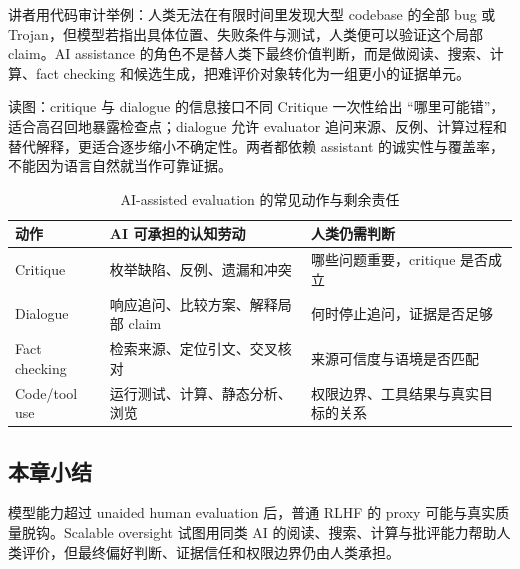 讲者用代码审计举例：人类无法在有限时间里发现大型 codebase 的全部 bug 或 Trojan，但模型若指出具体位置、失败条件与测试，人类便可以验证这个局部 claim。AI assistance 的角色不是替人类下最终价值判断，而是做阅读、搜索、计算、fact checking 和候选生成，把难评价对象转化为一组更小的证据单元。


\begin{knowledgebox}{读图：critique 与 dialogue 的信息接口不同}
Critique 一次性给出 ``哪里可能错''，适合高召回地暴露检查点；dialogue 允许 evaluator 追问来源、反例、计算过程和替代解释，更适合逐步缩小不确定性。两者都依赖 assistant 的诚实性与覆盖率，不能因为语言自然就当作可靠证据。
\end{knowledgebox}

\begin{table}[H]
\centering
\caption{AI-assisted evaluation 的常见动作与剩余责任}
\begin{tabularx}{\textwidth}{L{2.6cm} X X}
\toprule
动作 & AI 可承担的认知劳动 & 人类仍需判断 \\
\midrule
Critique & 枚举缺陷、反例、遗漏和冲突 & 哪些问题重要，critique 是否成立 \\
Dialogue & 响应追问、比较方案、解释局部 claim & 何时停止追问，证据是否足够 \\
Fact checking & 检索来源、定位引文、交叉核对 & 来源可信度与语境是否匹配 \\
Code/tool use & 运行测试、计算、静态分析、浏览 & 权限边界、工具结果与真实目标的关系 \\
\bottomrule
\end{tabularx}
\end{table}

\subsection{本章小结}

模型能力超过 unaided human evaluation 后，普通 RLHF 的 proxy 可能与真实质量脱钩。Scalable oversight 试图用同类 AI 的阅读、搜索、计算与批评能力帮助人类评价，但最终偏好判断、证据信任和权限边界仍由人类承担。

